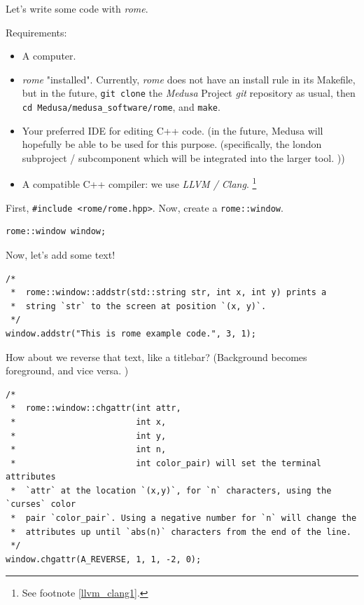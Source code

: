 \documentclass{report}
\newcommand{\Medusa}{\textit{Medusa}\xspace}
\begin{document}
	Let's write some code with \textit{rome}.

	Requirements:
	\begin{itemize}
		\item A computer.
		
		\item \textit{rome} "installed". Currently, \textit{rome} does not have
		an install rule in its Makefile, but in the future, \texttt{git clone}
		the \Medusa Project \textit{git} repository as usual, then \texttt{cd
		Medusa/medusa\_software/rome}, and \texttt{make}.

		\item Your preferred IDE for editing C++ code. (in the future, Medusa
		will hopefully be able to be used for this purpose. (specifically, the
		london subproject / subcomponent which will be integrated into the
		larger tool. ))

		\item A compatible C++ compiler: we use \textit{LLVM / Clang}.
		\footnote{
			See footnote \ref{llvm_clang1}.
		}
	\end{itemize}

	First, \texttt{\#include <rome/rome.hpp>}. Now, create a
	\texttt{rome::window}.

	\begin{lstlisting}
rome::window window;
	\end{lstlisting}

	Now, let's add some text!

	\begin{lstlisting}
/*
 *  rome::window::addstr(std::string str, int x, int y) prints a
 *  string `str` to the screen at position `(x, y)`.
 */
window.addstr("This is rome example code.", 3, 1);
	\end{lstlisting}

	How about we reverse that text, like a titlebar? (Background becomes
	foreground, and vice versa. )

	\begin{lstlisting}
/*
 *  rome::window::chgattr(int attr,
 *  					  int x,
 *  					  int y,
 *  					  int n,
 *  					  int color_pair) will set the terminal attributes
 *  `attr` at the location `(x,y)`, for `n` characters, using the `curses` color
 *  pair `color_pair`. Using a negative number for `n` will change the
 *  attributes up until `abs(n)` characters from the end of the line.
 */
window.chgattr(A_REVERSE, 1, 1, -2, 0);
	\end{lstlisting}
\end{document}
